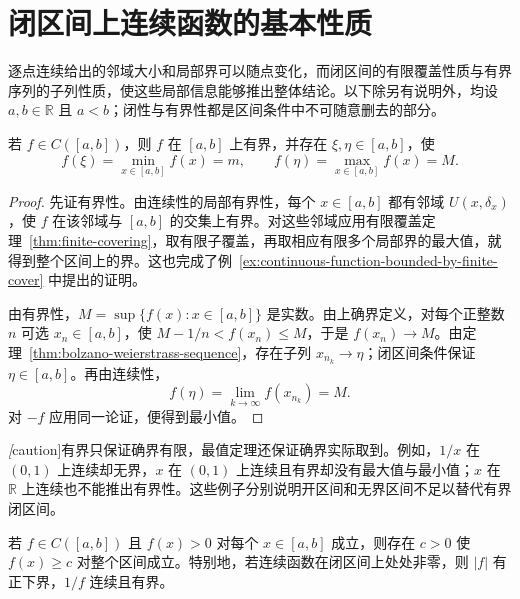 \documentclass[UTF8,12pt,a4paper,fontset=fandol]{ctexbook}
\begin{document}
\section{闭区间上连续函数的基本性质}
\label{sec:continuous-functions-on-closed-intervals}

逐点连续给出的邻域大小和局部界可以随点变化，而闭区间的有限覆盖性质与有界序列的子列性质，使这些局部信息能够推出整体结论。以下除另有说明外，均设 $a,b\in\mathbb{R}$ 且 $a<b$；闭性与有界性都是区间条件中不可随意删去的部分。

\begin{theorem}[有界性与最值定理]
\label{thm:boundedness-and-extreme-values}
若 $f\in C([a,b])$，则 $f$ 在 $[a,b]$ 上有界，并存在 $\xi,\eta\in[a,b]$，使
\begin{equation}
    f(\xi)=\min_{x\in[a,b]}f(x)=m,
    \qquad f(\eta)=\max_{x\in[a,b]}f(x)=M.
    \label{eq:extreme-values-on-closed-interval}
\end{equation}
\end{theorem}

\begin{proof}
先证有界性。由连续性的局部有界性，每个 $x\in[a,b]$ 都有邻域 $U(x,\delta_x)$，使 $f$ 在该邻域与 $[a,b]$ 的交集上有界。对这些邻域应用有限覆盖定理~\ref{thm:finite-covering}，取有限子覆盖，再取相应有限多个局部界的最大值，就得到整个区间上的界。这也完成了例~\ref{ex:continuous-function-bounded-by-finite-cover} 中提出的证明。

由有界性，$M=\sup\{f(x):x\in[a,b]\}$ 是实数。由上确界定义，对每个正整数 $n$ 可选 $x_n\in[a,b]$，使 $M-1/n<f(x_n)\leq M$，于是 $f(x_n)\to M$。由定理~\ref{thm:bolzano-weierstrass-sequence}，存在子列 $x_{n_k}\to\eta$；闭区间条件保证 $\eta\in[a,b]$。再由连续性，
\[
    f(\eta)=\lim_{k\to\infty}f(x_{n_k})=M.
\]
对 $-f$ 应用同一论证，便得到最小值。
\end{proof}

\emph[caution]{有界只保证确界有限，最值定理还保证确界实际取到。}例如，$1/x$ 在 $(0,1)$ 上连续却无界，$x$ 在 $(0,1)$ 上连续且有界却没有最大值与最小值；$x$ 在 $\mathbb{R}$ 上连续也不能推出有界性。这些例子分别说明开区间和无界区间不足以替代有界闭区间。

\begin{corollary}[严格正的连续函数有统一正下界]
\label{cor:positive-continuous-function-lower-bound}
若 $f\in C([a,b])$ 且 $f(x)>0$ 对每个 $x\in[a,b]$ 成立，则存在 $c>0$ 使 $f(x)\geq c$ 对整个区间成立。特别地，若连续函数在闭区间上处处非零，则 $|f|$ 有正下界，$1/f$ 连续且有界。
\end{corollary}
\end{document}
